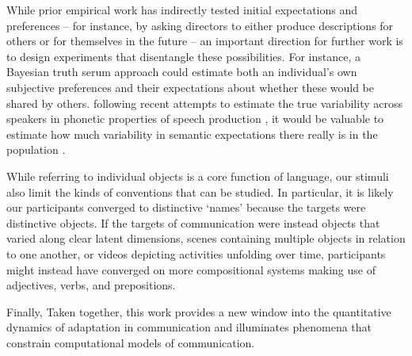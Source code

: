 \documentclass[alpha-refs]{wiley-article}
\begin{document}
While prior empirical work has indirectly tested initial expectations and  preferences -- for instance, by asking directors to either produce descriptions for others or for themselves in the future \citep{FussellKrauss89_IntendedAudienceCommonGround} -- an important direction for further work is to design experiments that disentangle these possibilities.
For instance, a Bayesian truth serum approach \citep{prelec2004bayesian} could estimate both an individual's own subjective preferences and their expectations about whether these would be shared by others.
 following recent attempts to estimate the true variability across speakers in phonetic properties of speech production \citep{kleinschmidt2019structure}, it would be valuable to estimate how much variability in semantic expectations there really is in the population \citep{FurnasEtAl87_VocabularyProblem}.
 
While referring to individual objects is a core function of language, our stimuli also limit the kinds of conventions that can be studied. 
In particular, it is likely our participants converged to distinctive `names' because the targets were distinctive objects.
If the targets of communication were instead objects that varied along clear latent dimensions, scenes containing multiple objects in relation to one another, or videos depicting activities unfolding over time, participants might instead have converged on more compositional systems making use of adjectives, verbs, and prepositions.

Finally, 
Taken together, this work provides a new window into the quantitative dynamics of adaptation in communication and illuminates phenomena that constrain computational models of communication. 
%
\end{document}
